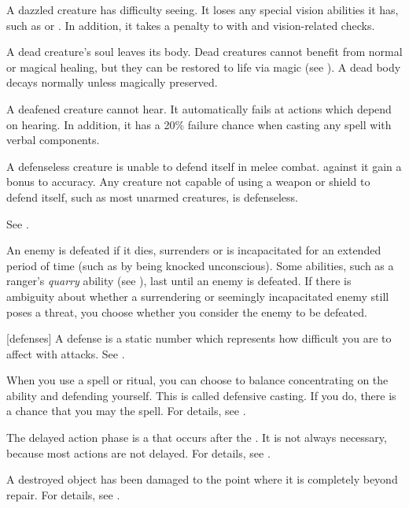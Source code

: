  A dazzled creature has difficulty seeing.
It loses any special vision abilities it has, such as  or .
In addition, it takes a  penalty to  with  and vision-related checks.

 A dead creature's soul leaves its body. Dead creatures cannot benefit from normal or magical healing, but they can be restored to life via magic (see ). A dead body decays normally unless magically preserved.

 A deafened creature cannot hear. It automatically fails at actions which depend on hearing. In addition, it has a 20\% failure chance when casting any spell with verbal components.

 A defenseless creature is unable to defend itself in melee combat.
 against it gain a  bonus to accuracy.
Any creature not capable of using a weapon or shield to defend itself, such as most unarmed creatures, is defenseless.

 See .

 An enemy is defeated if it dies, surrenders or is incapacitated for an extended period of time (such as by being knocked unconscious).
Some abilities, such as a ranger's \textit{quarry} ability (see ), last until an enemy is defeated.
If there is ambiguity about whether a surrendering or seemingly incapacitated enemy still poses a threat, you choose whether you consider the enemy to be defeated.

[defenses] A defense is a static number which represents how difficult you are to affect with attacks. See .

 When you use a spell or ritual, you can choose to balance concentrating on the ability and defending yourself.
This is called defensive casting.
If you do, there is a chance that you may  the spell.
For details, see .

 The delayed action phase is a  that occurs after the .
It is not always necessary, because most actions are not delayed.
For details, see .

 A destroyed object has been damaged to the point where it is completely beyond repair.
For details, see .

